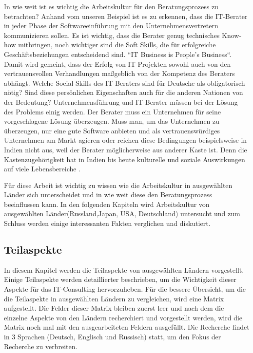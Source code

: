 	In wie weit ist es wichtig die Arbeitskultur für den Beratungsprozess zu betrachten? Anhand vom unseren Beispiel ist es zu erkennen, dass die IT-Berater in jeder Phase der Softwareeinführung mit den Unternehmensvertretern kommunizieren sollen. Es ist wichtig, dass die Berater genug technisches Know-how mitbringen, noch wichtiger sind die Soft Skills, die für erfolgreiche Geschäftsbeziehungen entscheidend sind. ``IT Business is People's Business``. Damit wird gemeint, dass der Erfolg von   IT-Projekten sowohl auch von den vertrauensvollen Verhandlungen maßgeblich von der Kompetenz des Beraters abhängt. \cite{ITConsRu}
	Welche Social Skills des IT-Beraters sind für Deutsche als obligatorisch nötig? Sind diese persönlichen Eigenschaften auch für die anderen Nationen von der Bedeutung? Unternehmensführung und IT-Berater müssen bei der Lösung des Problems einig werden. Der Berater muss ein Unternehmen für seine vorgeschlagene Lösung überzeugen. Muss man, um das Unternehmen zu überzeugen, nur eine gute Software anbieten und als vertrauenswürdiges Unternehmen am Markt agieren oder reichen diese Bedingungen beispielsweise in Indien nicht aus, weil der Berater möglicherweise aus anderer Kaste ist. Denn die Kastenzugehörigkeit hat in Indien bis heute kulturelle und soziale Auswirkungen auf viele Lebensbereiche \cite{KastensystemInd}.

	Für diese Arbeit ist wichtig zu wissen wie die Arbeitskultur in ausgewählten Länder sich unterscheidet und in wie weit diese den Beratungsprozess beeinflussen kann.
	In den folgenden Kapiteln wird Arbeitskultur von ausgewählten Länder(Russland,Japan, USA, Deutschland) untersucht und zum Schluss werden einige interessanten Fakten verglichen und diskutiert. 
\subsection{Teilaspekte}
	In diesem Kapitel werden die Teilaspekte von ausgewählten Ländern vorgestellt. Einige Teilaspekte werden detaillierter beschrieben, um die Wichtigkeit dieser Aspekte für das IT-Consulting hervorzuheben. Für die bessere Übersicht, um die die Teilaspekte in ausgewählten Ländern zu vergleichen, wird eine Matrix aufgestellt. Die Felder dieser Matrix bleiben zuerst leer und nach dem die einzelne Aspekte von den Ländern recherchiert und vorgestellt werden, wird die Matrix noch mal mit den ausgearbeiteten Feldern ausgefüllt. Die Recherche findet in 3 Sprachen (Deutsch, Englisch und Russisch) statt, um den Fokus der Recherche zu verbreiten.
	
